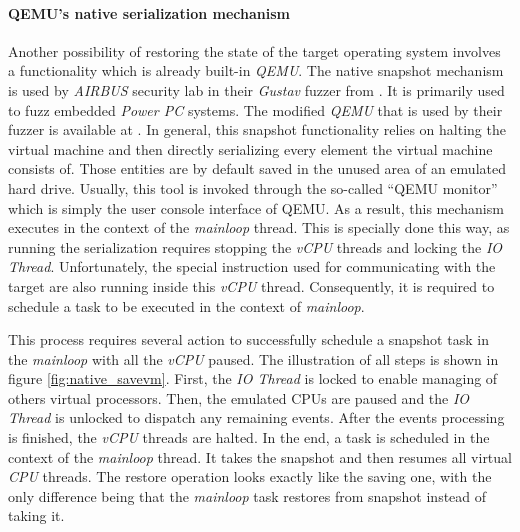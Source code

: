 \paragraph{QEMU's native serialization mechanism}
Another possibility of restoring the state of the target operating system involves a functionality which is already built-in \textit{QEMU}. The native snapshot mechanism is used by \textit{AIRBUS} security lab in their \textit{Gustav} fuzzer from \cite{gustavdoc}. It is primarily used to fuzz embedded \textit{Power PC} systems. The modified \textit{QEMU} that is used by their fuzzer is available at \cite{airbusqemu}. In general, this snapshot functionality relies on halting the virtual machine and then directly serializing every element the virtual machine consists of. Those entities are by default saved in the unused area of an emulated hard drive. Usually, this tool is invoked through the so-called “QEMU monitor” which is simply the user console interface of QEMU. As a result, this mechanism executes in the context of the \textit{mainloop} thread. This is specially done this way, as running the serialization requires stopping the \textit{vCPU} threads and locking the \textit{IO Thread}. Unfortunately, the special instruction used for communicating with the target are also running inside this \textit{vCPU} thread. Consequently, it is required to schedule a task to be executed in the context of \textit{mainloop}.

This process requires several action to successfully schedule a snapshot task in the \textit{mainloop} with all the \textit{vCPU} paused. The illustration of all steps is shown in figure \ref{fig:native_savevm}. First, the \textit{IO Thread} is locked to enable managing of others virtual processors. Then, the emulated CPUs are paused and the \textit{IO Thread} is unlocked to dispatch any remaining events. After the events processing is finished, the \textit{vCPU} threads are halted. In the end, a task is scheduled in the context of the \textit{mainloop} thread. It takes the snapshot and then resumes all virtual \textit{CPU} threads. The restore operation looks exactly like the saving one, with the only difference being that the \textit{mainloop} task restores from snapshot instead of taking it.

